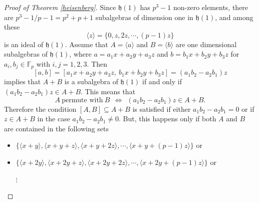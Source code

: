 \documentclass{amsart}
\theoremstyle{definition}
\numberwithin{equation}{section}
\begin{document}
\begin{proof}[Proof of Theorem \ref{heisenberg}]
Since $\mathfrak{h}(1)$ has $p^3-1$ non-zero elements,  there are $p^3-1/p-1=p^2+p+1$   subalgebras of dimension one in $\mathfrak{h}(1)$, and among these \[\langle z\rangle=\{0, z, 2z, \cdots, (p-1)z\}\] is an ideal of $\mathfrak{h}(1)$. 
Assume that $A=\langle a \rangle$ and $B=\langle b \rangle$ are  one dimensional  subalgebras of $\mathfrak{h}(1)$, where $a=a_1x+a_2y+a_3z$ and $b=b_1x+b_2y+b_3z$ for $a_i,b_j\in \mathbb{F}_p$ with $i,j=1,2,3.$ 
Then 
\[[a,b]=[a_1x+a_2y+a_3z, \ b_1x+b_2y+b_3z]=(a_1b_2-a_2b_1)z\] implies that $A+B$ is a subalgebra of $\mathfrak{h}(1)$ if and only if $(a_1b_2-a_2b_1)z \in A+B$. This means that 
\[A  \ \mbox{permute with} \  B   \  \ \Longleftrightarrow \ \ (a_1b_2-a_2b_1)z \in A+B.\]  Therefore the condition  $[A, B]\subseteq A+B$ is satisfied if either $a_1b_2-a_2b_1=0$ or  if $z\in A+B$ in the case $a_1b_2-a_2b_1\neq 0$.  But, this happens only if both $A$ and $B$ are contained in the following sets  
\begin{itemize}
    \item [1).] $\{\langle  x+y \rangle, \langle x+y+z\rangle, \langle x+y+2z\rangle, \cdots , \langle x+y+(p-1)z\rangle \}$ or
    \item [2).] $\{\langle  x+2y \rangle, \langle x+2y+z\rangle, \langle x+2y+2z\rangle, \cdots , \langle x+2y+(p-1)z\rangle \}$ or 

$\vdots$


\end{itemize}
\end{proof}
\end{document}
